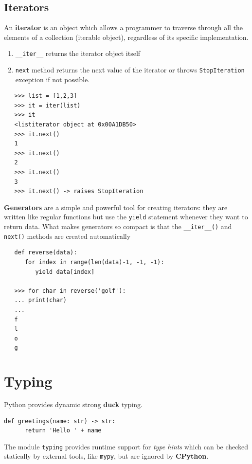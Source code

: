 \subsection{Iterators}
\begin{paracol}{2}
   An \textbf{iterator} is an object which allows a programmer to traverse through all the
   elements of a collection (iterable object), regardless of its specific implementation.
   \begin{enumerate}
      \item \lstinline|__iter__| returns the iterator object itself
      \item \lstinline|next| method returns the next value of the iterator or throws \lstinline|StopIteration| exception if not possible.
   \end{enumerate}
   
   \switchcolumn

   \begin{lstlisting}
   >>> list = [1,2,3]
   >>> it = iter(list)
   >>> it
   <listiterator object at 0x00A1DB50>
   >>> it.next()
   1
   >>> it.next()
   2
   >>> it.next()
   3
   >>> it.next() -> raises StopIteration
   \end{lstlisting}
\end{paracol}

\textbf{Generators} are a simple and powerful tool for creating iterators:
they are written like regular functions but use the \lstinline|yield| statement whenever they want to return data.
What makes generators so compact is that the \lstinline|__iter__()| and
\lstinline|next()| methods are created automatically
\begin{lstlisting}
   def reverse(data):
      for index in range(len(data)-1, -1, -1):
         yield data[index]

   >>> for char in reverse('golf'):
   ... print(char)
   ...
   f
   l
   o
   g
\end{lstlisting}

\section{Typing}
Python provides dynamic strong \textbf{duck} typing.
\begin{lstlisting}[caption={Code can be annotated with types}]
   def greetings(name: str) -> str:
      return 'Hello ' + name
\end{lstlisting}
The module \lstinline|typing| provides runtime support for \textit{type hints} which can be checked statically by
external tools, like \lstinline|mypy|, but are ignored by \textbf{CPython}.

